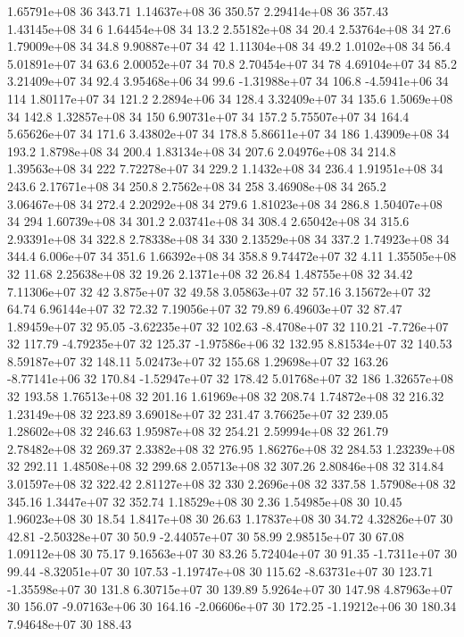 1.65791e+08 36 343.71
1.14637e+08 36 350.57
2.29414e+08 36 357.43
1.43145e+08 34 6
1.64454e+08 34 13.2
2.55182e+08 34 20.4
2.53764e+08 34 27.6
1.79009e+08 34 34.8
9.90887e+07 34 42
1.11304e+08 34 49.2
1.0102e+08 34 56.4
5.01891e+07 34 63.6
2.00052e+07 34 70.8
2.70454e+07 34 78
4.69104e+07 34 85.2
3.21409e+07 34 92.4
3.95468e+06 34 99.6
-1.31988e+07 34 106.8
-4.5941e+06 34 114
1.80117e+07 34 121.2
2.2894e+06 34 128.4
3.32409e+07 34 135.6
1.5069e+08 34 142.8
1.32857e+08 34 150
6.90731e+07 34 157.2
5.75507e+07 34 164.4
5.65626e+07 34 171.6
3.43802e+07 34 178.8
5.86611e+07 34 186
1.43909e+08 34 193.2
1.8798e+08 34 200.4
1.83134e+08 34 207.6
2.04976e+08 34 214.8
1.39563e+08 34 222
7.72278e+07 34 229.2
1.1432e+08 34 236.4
1.91951e+08 34 243.6
2.17671e+08 34 250.8
2.7562e+08 34 258
3.46908e+08 34 265.2
3.06467e+08 34 272.4
2.20292e+08 34 279.6
1.81023e+08 34 286.8
1.50407e+08 34 294
1.60739e+08 34 301.2
2.03741e+08 34 308.4
2.65042e+08 34 315.6
2.93391e+08 34 322.8
2.78338e+08 34 330
2.13529e+08 34 337.2
1.74923e+08 34 344.4
6.006e+07 34 351.6
1.66392e+08 34 358.8
9.74472e+07 32 4.11
1.35505e+08 32 11.68
2.25638e+08 32 19.26
2.1371e+08 32 26.84
1.48755e+08 32 34.42
7.11306e+07 32 42
3.875e+07 32 49.58
3.05863e+07 32 57.16
3.15672e+07 32 64.74
6.96144e+07 32 72.32
7.19056e+07 32 79.89
6.49603e+07 32 87.47
1.89459e+07 32 95.05
-3.62235e+07 32 102.63
-8.4708e+07 32 110.21
-7.726e+07 32 117.79
-4.79235e+07 32 125.37
-1.97586e+06 32 132.95
8.81534e+07 32 140.53
8.59187e+07 32 148.11
5.02473e+07 32 155.68
1.29698e+07 32 163.26
-8.77141e+06 32 170.84
-1.52947e+07 32 178.42
5.01768e+07 32 186
1.32657e+08 32 193.58
1.76513e+08 32 201.16
1.61969e+08 32 208.74
1.74872e+08 32 216.32
1.23149e+08 32 223.89
3.69018e+07 32 231.47
3.76625e+07 32 239.05
1.28602e+08 32 246.63
1.95987e+08 32 254.21
2.59994e+08 32 261.79
2.78482e+08 32 269.37
2.3382e+08 32 276.95
1.86276e+08 32 284.53
1.23239e+08 32 292.11
1.48508e+08 32 299.68
2.05713e+08 32 307.26
2.80846e+08 32 314.84
3.01597e+08 32 322.42
2.81127e+08 32 330
2.2696e+08 32 337.58
1.57908e+08 32 345.16
1.3447e+07 32 352.74
1.18529e+08 30 2.36
1.54985e+08 30 10.45
1.96023e+08 30 18.54
1.8417e+08 30 26.63
1.17837e+08 30 34.72
4.32826e+07 30 42.81
-2.50328e+07 30 50.9
-2.44057e+07 30 58.99
2.98515e+07 30 67.08
1.09112e+08 30 75.17
9.16563e+07 30 83.26
5.72404e+07 30 91.35
-1.7311e+07 30 99.44
-8.32051e+07 30 107.53
-1.19747e+08 30 115.62
-8.63731e+07 30 123.71
-1.35598e+07 30 131.8
6.30715e+07 30 139.89
5.9264e+07 30 147.98
4.87963e+07 30 156.07
-9.07163e+06 30 164.16
-2.06606e+07 30 172.25
-1.19212e+06 30 180.34
7.94648e+07 30 188.43
